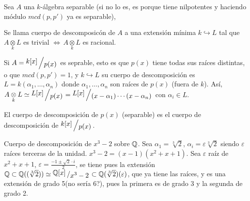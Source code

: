 Sea $A$ una $k$-álgebra separable (si no lo es, es porque tiene nilpotentes y haciendo m\'odulo $mcd(p,p')$ ya es separable), 
    \begin{defi}
        Se llama cuerpo de descomposic\'on de $A$ a una extensi\'on m\'inima $k \hookrightarrow L$ tal que $A \underset{k}{\otimes} L$ es trivial $\iff \, A\underset{k}{\otimes} L $ es racional. 
    \end{defi}
    \begin{ejem}
        Si $A = \modulo{k[x]}{p(x)}$ es seprable, esto es que $p(x)$ tiene todas sus ra\'ices distintas, o que $mcd(p,p')=1$, y $k\hookrightarrow L$ su cuerpo de descomposici\'on es $L= k(\alpha_1, \ldots, \alpha_n)$ donde $\alpha_1, \ldots, \alpha_n$ son ra\'ices de $p(x)$ (fuera de $k$).  As\'i, $A\underset{k}{\otimes} L \simeq \modulo{L[x]}{p(x)} = \modulo{L[x]}{(x-\alpha_1) \cdots (x-\alpha_n)}$ con $\alpha_i \in L$. 
    \end{ejem}
    \begin{defi}
        El cuerpo de descomposici\'on de $p(x)$ (separable) es el cuerpo de descomposici\'on de $\modulo{k[x]}{p(x)}$. 
    \end{defi}\begin{ejem}
        Cuerpo de descomposici\'on de $x^3-2$ sobre $\mathbb{Q}$. Sea $\alpha_1 = \sqrt[3]{2}$, $\alpha_i= \varepsilon  \sqrt[3]{2}$ siendo $\varepsilon$ ra\'ices terceras de la unidad. $x^3-2 = (x-1) (x^2+x+1)$. Sea $\varepsilon$ ra\'iz de $x^2+x+1$, $\varepsilon = \frac{-1 \pm \sqrt{2} \cdot i}{2}$, se tiene pues la extensi\'on $\bb Q \subset \bb Q(( \sqrt[3]{2})) \simeq \modulo{\bb Q[x]}{x^3-2} \subset \bb Q( \sqrt[3]{2})(\varepsilon)$, que ya tiene las ra\'ices, y es una extensi\'on de grado 5(no ser\'ia 6?), pues la primera es de grado 3 y la segunda de grado 2. 
    \end{ejem}
